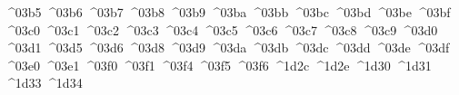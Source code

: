 {  ^^^^03b5%
  ^^^^03b6%
  ^^^^03b7%
  ^^^^03b8%
  ^^^^03b9%
  ^^^^03ba%
  ^^^^03bb%
  ^^^^03bc%
  ^^^^03bd%
  ^^^^03be%
  ^^^^03bf%
  ^^^^03c0%
  ^^^^03c1%
  ^^^^03c2%
  ^^^^03c3%
  ^^^^03c4%
  ^^^^03c5%
  ^^^^03c6%
  ^^^^03c7%
  ^^^^03c8%
  ^^^^03c9%
  ^^^^03d0%
  ^^^^03d1%
  ^^^^03d5%
  ^^^^03d6%
  ^^^^03d8%
  ^^^^03d9%
  ^^^^03da%
  ^^^^03db%
  ^^^^03dc%
  ^^^^03dd%
  ^^^^03de%
  ^^^^03df%
  ^^^^03e0%
  ^^^^03e1%
  ^^^^03f0%
  ^^^^03f1%
  ^^^^03f4%
  ^^^^03f5%
  ^^^^03f6%
  ^^^^1d2c%
  ^^^^1d2e%
  ^^^^1d30%
  ^^^^1d31%
  ^^^^1d33%
  ^^^^1d34%
}
